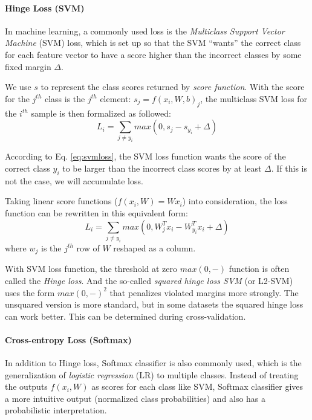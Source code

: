 \documentclass[10pt,twocolumn,letterpaper]{article}
\begin{document}
\paragraph{Hinge Loss (SVM)}
	In machine learning, a commonly used loss is the \emph{Multiclass Support Vector Machine} (SVM) loss, which is set up so that the SVM ``wants'' the correct class for each feature vector to have a score higher than the incorrect classes by some fixed margin $\Delta$.

	We use $s$ to represent the class scores returned by \textit{score function}. With the score for the $j^{th}$ class is the $j^{th}$ element: $s_j=f(x_i, W, b)_j$, the multiclass SVM loss for the $i^{th}$ sample is then formalized as followed:
\begin{equation}
	L_i = \sum_{j \neq y_i} max(0, s_j - s_{y_i} + \Delta)\label{eq:svmloss}
\end{equation}

	According to Eq. \eqref{eq:svmloss}, the SVM loss function wants the score of the correct class $y_i$ to be larger than the incorrect class scores by at least $\Delta$. If this is not the case, we will accumulate loss.
	
	Taking linear score functions ($f(x_i, W) = W x_i$) into consideration, the loss function can be rewritten in this equivalent form:
\begin{equation}
	L_i = \sum_{j \neq y_i} max(0, W_j^T x_i - W_{y_i}^T x_i + \Delta)
\end{equation}
	where $w_j$ is the $j^{th}$ row of $W$ reshaped as a column.
	
	With SVM loss function, the threshold at zero $max(0,-)$ function is often called the \emph{Hinge loss}. And the so-called \emph{squared hinge loss SVM} (or L2-SVM) uses the form $max(0,-)^2$ that penalizes violated margins more strongly. The unsquared version is more standard, but in some datasets the squared hinge loss can work better. This can be determined during cross-validation. \cite{svmCS231n}

\paragraph{Cross-entropy Loss (Softmax)}                             
	In addition to Hinge loss, Softmax classifier is also commonly used, which is the generalization of \emph{logistic regression} (LR) to multiple classes. Instead of treating the outputs $f(x_i, W)$ as scores for each class like SVM, Softmax classifier gives a more intuitive output (normalized class probabilities) and also has a probabilistic interpretation. 
	
\end{document}
